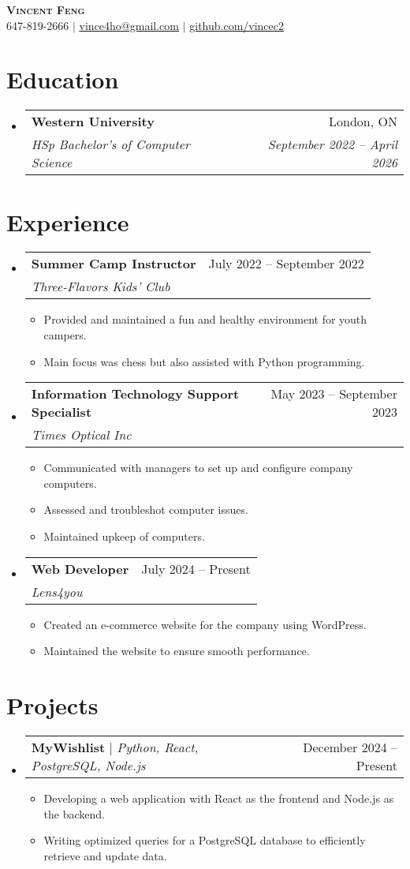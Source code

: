 \documentclass[letterpaper,12pt]{article} %
\makeatletter
\newcommand{\resumeItem}[1]{
  \item\small{
    {#1 \vspace{-2pt}}
  }
}
\newcommand{\resumeSubheading}[4]{
  \vspace{-2pt}\item
    \begin{tabular*}{0.97\textwidth}[t]{l@{\extracolsep{\fill}}r}
      \textbf{#1} & #2 \\
      \textit{\small#3} & \textit{\small #4} \\
    \end{tabular*}\vspace{-7pt}
}
\newcommand{\resumeProjectHeading}[2]{
    \item
    \begin{tabular*}{0.97\textwidth}{l@{\extracolsep{\fill}}r}
      \small#1 & #2 \\
    \end{tabular*}\vspace{-7pt}
}
\newcommand{\resumeSubHeadingListStart}{\begin{itemize}[leftmargin=0.15in, label={}]}
\newcommand{\resumeSubHeadingListEnd}{\end{itemize}}
\newcommand{\resumeItemListStart}{\begin{itemize}}
\newcommand{\resumeItemListEnd}{\end{itemize}\vspace{-5pt}}
\makeatother
\begin{document}
\begin{center}
    \textbf{\Huge \scshape Vincent Feng} \\ \vspace{1pt}
    \small 647-819-2666 $|$ \href{mailto:x@x.com}{\underline{vince4ho@gmail.com}} $|$ 
    \href{https://github.com/...}{\underline{github.com/vincec2}}
\end{center}

\section{Education}
  \resumeSubHeadingListStart
    \resumeSubheading
      {Western University}{London, ON}
      {HSp Bachelor's of Computer Science}{September 2022 -- April 2026}
  \resumeSubHeadingListEnd

\section{Experience}
  \resumeSubHeadingListStart

    \resumeSubheading
      {Summer Camp Instructor}{July 2022 -- September 2022}
      {Three-Flavors Kids' Club}{}
      \resumeItemListStart
        \resumeItem{Provided and maintained a fun and healthy environment for youth campers.}
        \resumeItem{Main focus was chess but also assisted with Python programming.}
      \resumeItemListEnd

    \resumeSubheading
      {Information Technology Support Specialist}{May 2023 -- September 2023}
      {Times Optical Inc}{}
      \resumeItemListStart
        \resumeItem{Communicated with managers to set up and configure company computers.}
        \resumeItem{Assessed and troubleshot computer issues.}
        \resumeItem{Maintained upkeep of computers.}
    \resumeItemListEnd

    \resumeSubheading
      {Web Developer}{July 2024 -- Present}
      {Lens4you}{}
      \resumeItemListStart
        \resumeItem{Created an e-commerce website for the company using WordPress.}
        \resumeItem{Maintained the website to ensure smooth performance.}
      \resumeItemListEnd

  \resumeSubHeadingListEnd

\section{Projects}
    \resumeSubHeadingListStart
      \resumeProjectHeading
          {\textbf{MyWishlist} $|$ \emph{Python, React, PostgreSQL, Node.js}}{December 2024 -- Present}
          \resumeItemListStart
            \resumeItem{Developing a web application with React as the frontend and Node.js as the backend.}
            \resumeItem{Writing optimized queries for a PostgreSQL database to efficiently retrieve and update data.}
          \resumeItemListEnd
    \resumeSubHeadingListEnd
\end{document}

